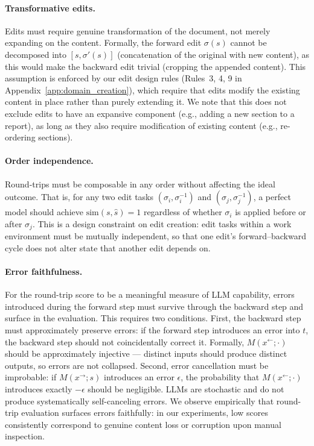 \documentclass{article} %
\begin{document}
\paragraph{Transformative edits.} Edits must require genuine transformation of the document, not merely expanding on the content. Formally, the forward edit $\sigma(s)$ cannot be decomposed into $[s, \sigma'(s)]$ (concatenation of the original with new content), as this would make the backward edit trivial (cropping the appended content). This assumption is enforced by our edit design rules (Rules~3, 4, 9 in Appendix~\ref{app:domain_creation}), which require that edits modify the existing content in place rather than purely extending it. We note that this does not exclude edits to have an expansive component (e.g., adding a new section to a report), as long as they also require modification of existing content (e.g., re-ordering sections).

\paragraph{Order independence.} Round-trips must be composable in any order without affecting the ideal outcome. That is, for any two edit tasks $(\sigma_i, \sigma_i^{-1})$ and $(\sigma_j, \sigma_j^{-1})$, a perfect model should achieve $\mathrm{sim}(s, \hat{s}) = 1$ regardless of whether $\sigma_i$ is applied before or after $\sigma_j$. This is a design constraint on edit creation: edit tasks within a work environment must be mutually independent, so that one edit's forward--backward cycle does not alter state that another edit depends on.

\paragraph{Error faithfulness.} For the round-trip score to be a meaningful measure of LLM capability, errors introduced during the forward step must survive through the backward step and surface in the evaluation. This requires two conditions. First, the backward step must approximately preserve errors: if the forward step introduces an error into $t$, the backward step should not coincidentally correct it. Formally, $M(x^{\leftarrow}; \cdot)$ should be approximately injective --- distinct inputs should produce distinct outputs, so errors are not collapsed. Second, error cancellation must be improbable: if $M(x^{\rightarrow}; s)$ introduces an error $\epsilon$, the probability that $M(x^{\leftarrow}; \cdot)$ introduces exactly $-\epsilon$ should be negligible. LLMs are stochastic and do not produce systematically self-canceling errors. We observe empirically that round-trip evaluation surfaces errors faithfully: in our experiments, low scores consistently correspond to genuine content loss or corruption upon manual inspection.
\end{document}

